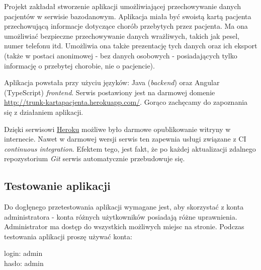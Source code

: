 Projekt zakładał stworzenie aplikacji umożliwiającej przechowywanie danych pacjentów w serwisie bazodanowym. Aplikacja miała być swoistą kartą pacjenta przechowującą informacje dotyczące chorób przebytych przez pacjenta. Ma ona umożliwiać bezpieczne przechowywanie danych wrażliwych, takich jak pesel, numer telefonu itd. Umożliwia ona także prezentację tych danych oraz ich eksport (także w postaci anonimowej - bez danych osobowych - posiadających tylko informację o przebytej chorobie, nie o pacjencie). 

Aplikacja powstała przy użyciu języków: Java (\textit{backend}) oraz Angular (TypeScript) \textit{frontend}. Serwis postawiony jest na darmowej domenie \url{http://trunk-kartapacjenta.herokuapp.com/}. Gorąco zachęcamy do zapoznania się z działaniem aplikacji. 

Dzięki serwisowi \href{https://heroku.com/} {Heroku} możliwe było darmowe opublikowanie witryny w internecie. Nawet w darmowej wersji serwis ten zapewnia usługi związane z CI \textit{continuous integration}. Efektem tego, jest fakt, że po każdej aktualizacji zdalnego repozystorium \textit{Git} serwis automatycznie przebudowuje się.

\subsection{Testowanie aplikacji}
Do dogłęnego przetestowania aplikacji wymagane jest, aby skorzystać z konta administratora - konta różnych użytkowników posiadają różne uprawnienia. Administrator ma dostęp do wszystkich możliwych miejsc na stronie. Podczas testowania aplikacji proszę używać konta:\\
\begin{center}
\label{credentials}
login: admin\\
hasło: admin
\end{center}